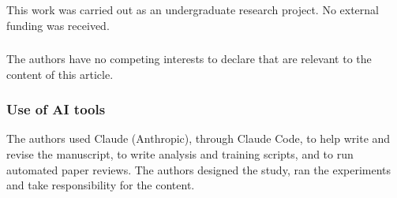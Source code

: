 \documentclass[runningheads]{llncs}
\begin{document}
\begin{credits}
\subsubsection{\ackname}
This work was carried out as an undergraduate research project. No external
funding was received.

\subsubsection{\discintname}
The authors have no competing interests to declare that are relevant to the
content of this article.

\subsubsection{Use of AI tools}
The authors used Claude (Anthropic), through Claude Code, to help write and
revise the manuscript, to write analysis and training scripts, and to run
automated paper reviews. The authors designed the study, ran the experiments
and take responsibility for the content.
\end{credits}
\end{document}
